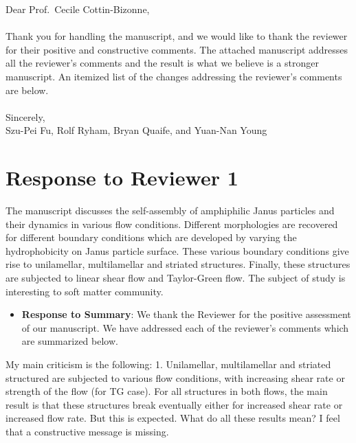 \documentclass[11pt]{article}
\newcommand{\comment}[1]{{\color{blue} #1}}
\begin{document}
\noindent
Dear Prof.~Cecile Cottin-Bizonne,
\\ \\
\noindent
Thank you for handling the manuscript, and we would like to thank the
reviewer for their positive and constructive comments. The attached
manuscript addresses all the reviewer's comments and the result is what
we believe is a stronger manuscript. An itemized list of the changes
addressing the reviewer's comments are below. 
\\ \\
\noindent
Sincerely,
\\
\noindent
Szu-Pei Fu, Rolf Ryham, Bryan Quaife, and Yuan-Nan Young

\section*{Response to Reviewer 1}
\noindent
\comment{The manuscript discusses the self-assembly of amphiphilic Janus
particles and their dynamics in various flow conditions. Different
morphologies are recovered for different boundary conditions which are
developed by varying the hydrophobicity on Janus particle surface.
These various boundary conditions give rise to unilamellar,
multilamellar and striated structures. Finally, these structures are
subjected to linear shear flow and Taylor-Green flow. The subject of
study is interesting to soft matter community.}

\begin{itemize}
  \item {\bf Response to Summary}: We thank the Reviewer for the
    positive assessment of our manuscript. We have addressed each of the
    reviewer's comments which are summarized below.
\end{itemize}


\noindent
\comment{My main criticism is the following: 1. Unilamellar,
multilamellar and striated structured are subjected to various flow
conditions, with increasing shear rate or strength of the flow (for TG
case). For all structures in both flows, the main result is that these
structures break eventually either for increased shear rate or increased
flow rate. But this is expected. What do all these results mean? I feel
that a constructive message is missing.}
\end{document}
